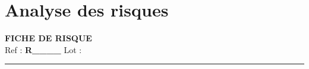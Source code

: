 \section{Analyse des risques}

\makeatletter
{}
\makeatother
\begin{center}
    {\LARGE \textbf{FICHE DE RISQUE}}\\[6pt]
    {\large Ref : \textbf{R\_\_\_\_} \hfill Lot : \underline{\hspace{6cm}}}\\[6pt]
    \hrule
\end{center}

\vspace{8pt}

